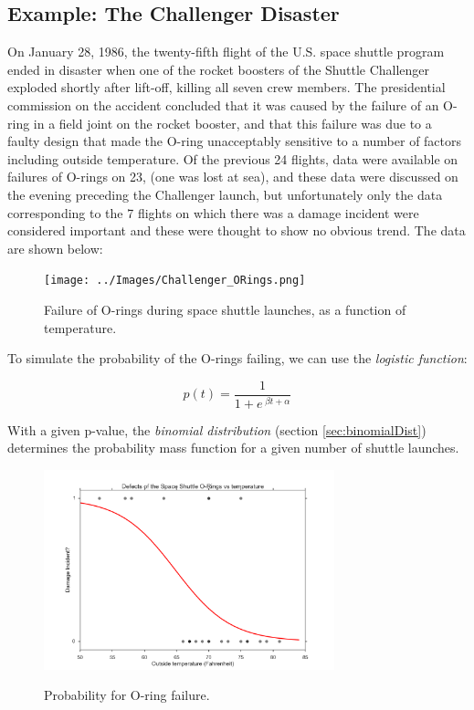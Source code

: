 \subsection{Example: The Challenger Disaster}

On January 28, 1986, the twenty-fifth flight of the U.S. space shuttle program ended in disaster when one of the rocket boosters of the Shuttle Challenger exploded shortly after lift-off, killing all seven crew members. The presidential commission on the accident concluded that it was caused by the failure of an O-ring in a field joint on the rocket booster, and that this failure was due to a faulty design that made the O-ring unacceptably sensitive to a number of factors including outside temperature. Of the previous 24 flights, data were available on failures of O-rings on 23, (one was lost at sea), and these data were discussed on the evening preceding the Challenger launch, but unfortunately only the data corresponding to the 7 flights on which there was a damage incident were considered important and these were thought to show no obvious trend. The data are shown below:

\begin{figure}[ht]
  \centering
  \texttt{[image: ../Images/Challenger\_ORings.png]}\\
  \caption{Failure of O-rings during space shuttle launches, as a function of temperature.}
\end{figure}

To simulate the probability of the O-rings failing, we can use the \emph{logistic function}:

\begin{equation*}
  p(t) = \frac{1}{ 1 + e^{ \;\beta t + \alpha } }
\end{equation*}

With a given p-value, the \emph{binomial distribution} (section \ref{sec:binomialDist}) determines the probability mass function for a given number of shuttle launches.



\begin{figure}
  \centering
  \includegraphics[width=0.75\textwidth]{../Images/ChallengerPlain.png}\\
  \caption{Probability for O-ring failure.}
  \label{fig:challengerPlain}
\end{figure}

